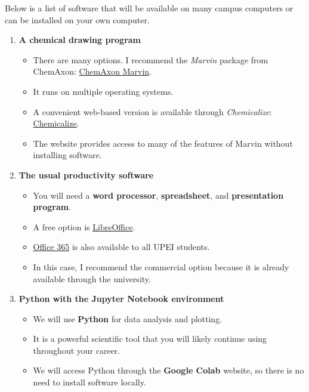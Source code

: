 Below is a list of software that will be available on many campus computers or can be installed on your own computer.

\begin{enumerate}
\item \textbf{A chemical drawing program}
    \begin{itemize}
    \item There are many options. I recommend the \emph{Marvin} package from ChemAxon:
    \href{https://chemaxon.com/products/marvin}{ChemAxon Marvin}.
    
    \item It runs on multiple operating systems.
    
    \item A convenient web-based version is available through \emph{Chemicalize}:
    \href{https://chemicalize.com/welcome}{Chemicalize}.
    
    \item The website provides access to many of the features of Marvin without installing software.
    \end{itemize}

\item \textbf{The usual productivity software}
    \begin{itemize}
    \item You will need a \textbf{word processor}, \textbf{spreadsheet}, and \textbf{presentation program}.
    
    \item A free option is
    \href{https://www.libreoffice.org/}{LibreOffice}.
    
    \item \href{https://www.upei.ca/learning2020/technology-basics/useful-applications}{Office 365}
    is also available to all UPEI students.
    
    \item In this case, I recommend the commercial option because it is already available through the university.
    \end{itemize}

\item \textbf{Python with the Jupyter Notebook environment}
    \begin{itemize}
    \item We will use \textbf{Python} for data analysis and plotting.
    
    \item It is a powerful scientific tool that you will likely continue using throughout your career.
    
    \item We will access Python through the \textbf{Google Colab} website, so there is no need to install software locally.
    \end{itemize}
\end{enumerate}

